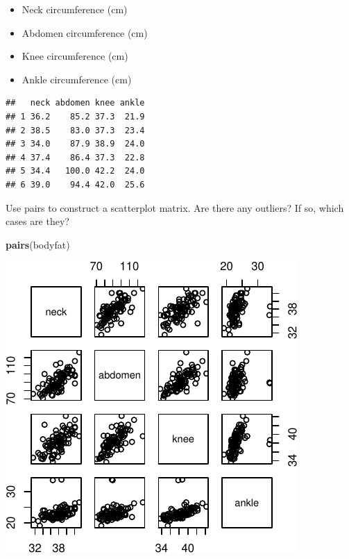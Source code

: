 \documentclass[]{article}
\newenvironment{Shaded}{\begin{snugshade}}{\end{snugshade}}
\newcommand{\DataTypeTok}[1]{\textcolor[rgb]{0.13,0.29,0.53}{#1}}
\newcommand{\KeywordTok}[1]{\textcolor[rgb]{0.13,0.29,0.53}{\textbf{#1}}}
\newcommand{\NormalTok}[1]{#1}
\newcommand{\OperatorTok}[1]{\textcolor[rgb]{0.81,0.36,0.00}{\textbf{#1}}}
\newcommand{\OtherTok}[1]{\textcolor[rgb]{0.56,0.35,0.01}{#1}}
\newcommand{\StringTok}[1]{\textcolor[rgb]{0.31,0.60,0.02}{#1}}
\providecommand{\tightlist}{%
  \setlength{\itemsep}{0pt}\setlength{\parskip}{0pt}}
\begin{document}
\begin{itemize}
\tightlist
\item
  Neck circumference (cm)
\item
  Abdomen circumference (cm)
\item
  Knee circumference (cm)
\item
  Ankle circumference (cm)
\end{itemize}

\begin{Shaded}
\end{Shaded}

\begin{verbatim}
##   neck abdomen knee ankle
## 1 36.2    85.2 37.3  21.9
## 2 38.5    83.0 37.3  23.4
## 3 34.0    87.9 38.9  24.0
## 4 37.4    86.4 37.3  22.8
## 5 34.4   100.0 42.2  24.0
## 6 39.0    94.4 42.0  25.6
\end{verbatim}

Use pairs to construct a scatterplot matrix. Are there any outliers? If
so, which cases are they?

\begin{Shaded}
\begin{Highlighting}[]
\KeywordTok{pairs}\NormalTok{(bodyfat)}
\end{Highlighting}
\end{Shaded}

\begin{center}\includegraphics{sol_A2_files/figure-latex/unnamed-chunk-9-1} \end{center}
\end{document}
